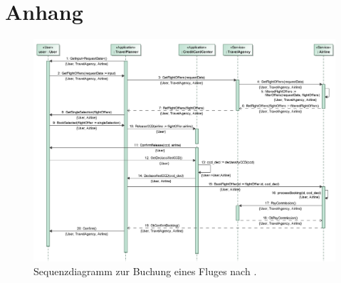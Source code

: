 

\chapter{Anhang}
\label{chap:appendix}


		
\setcounter{figure}{0}

\begin{figure}[htp]
	\centering
  	\includegraphics[width=1\textwidth]{images/travelplanner_seq_old.png}
	\caption{Sequenzdiagramm zur Buchung eines Fluges nach \cite{Stenzel2014}.}
	\label{sec:appendix:travelplanner:seq:old}
\end{figure}
	
